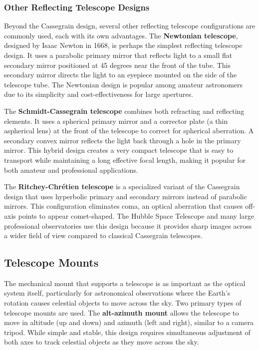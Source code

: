 \documentclass[
  a4paper,
]{book}
\begin{document}
\subsubsection{Other Reflecting Telescope
Designs}\label{other-reflecting-telescope-designs}

Beyond the Cassegrain design, several other reflecting telescope
configurations are commonly used, each with its own advantages. The
\textbf{Newtonian telescope}, designed by Isaac Newton in 1668, is
perhaps the simplest reflecting telescope design. It uses a parabolic
primary mirror that reflects light to a small flat secondary mirror
positioned at 45 degrees near the front of the tube. This secondary
mirror directs the light to an eyepiece mounted on the side of the
telescope tube. The Newtonian design is popular among amateur
astronomers due to its simplicity and cost-effectiveness for large
apertures.

The \textbf{Schmidt-Cassegrain telescope} combines both refracting and
reflecting elements. It uses a spherical primary mirror and a corrector
plate (a thin aspherical lens) at the front of the telescope to correct
for spherical aberration. A secondary convex mirror reflects the light
back through a hole in the primary mirror. This hybrid design creates a
very compact telescope that is easy to transport while maintaining a
long effective focal length, making it popular for both amateur and
professional applications.

The \textbf{Ritchey-Chrétien telescope} is a specialized variant of the
Cassegrain design that uses hyperbolic primary and secondary mirrors
instead of parabolic mirrors. This configuration eliminates coma, an
optical aberration that causes off-axis points to appear comet-shaped.
The Hubble Space Telescope and many large professional observatories use
this design because it provides sharp images across a wider field of
view compared to classical Cassegrain telescopes.

\subsection{Telescope Mounts}\label{telescope-mounts}

The mechanical mount that supports a telescope is as important as the
optical system itself, particularly for astronomical observations where
the Earth's rotation causes celestial objects to move across the sky.
Two primary types of telescope mounts are used. The \textbf{alt-azimuth
mount} allows the telescope to move in altitude (up and down) and
azimuth (left and right), similar to a camera tripod. While simple and
stable, this design requires simultaneous adjustment of both axes to
track celestial objects as they move across the sky.
\end{document}
